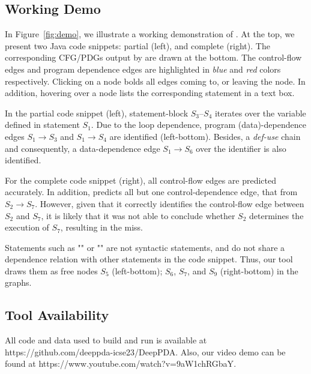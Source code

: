 \subsection{Working Demo}
In Figure~\ref{fig:demo}, we illustrate a working demonstration of \tool. At the top, we present two Java code snippets: partial (left), and complete (right). The corresponding CFG/PDGs output by \tool are drawn at the bottom. The control-flow edges and program dependence edges are highlighted in \textit{blue} and \textit{red} colors respectively. Clicking on a node bolds all edges coming to, or leaving the node. In addition, hovering over a node lists the corresponding statement in a text box.

In the partial code snippet (left), statement-block $S_3$--$S_4$ iterates over the variable  defined in statement $S_1$. Due to the loop dependence, program (data)-dependence edges $S_1{\rightarrow}S_3$ and $S_1{\rightarrow}S_4$ are identified (left-bottom). Besides, a \textit{def-use} chain and consequently, a data-dependence edge $S_1{\rightarrow}S_6$  over the identifier  is also identified.

For the complete code snippet (right), all control-flow edges are predicted accurately. In addition, \tool predicts all but one control-dependence edge, that from $S_2{\rightarrow}S_7$. However, given that it correctly identifies the control-flow edge between $S_2$ and $S_7$, it is likely that it was not able to conclude whether $S_2$ determines the execution of $S_7$, resulting in the miss.

Statements such as "\code{\{}" or "\code{\}}" are not syntactic statements, and do not share a dependence relation with other statements in the code snippet. Thus, our tool draws them as free nodes $S_5$ (left-bottom); $S_6$, $S_7$, and $S_9$ (right-bottom) in the graphs.

\subsection{Tool Availability}
All code and data used to build and run \tool is available at {https://github.com/deeppda-icse23/DeepPDA}. Also, our video demo can be found at {https://www.youtube.com/watch?v=9aW1chRGbaY}.